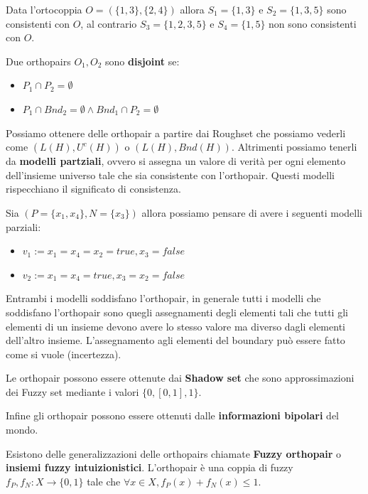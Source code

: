 \begin{esempio}
    Data l'ortocoppia $O=(\{1,3\}, \{2,4\})$ allora $S_1=\{1,3\}$ e $S_2=\{1,3,5\}$ 
    sono consistenti con $O$, al contrario $S_3=\{1,2,3,5\}$ e $S_4=\{1,5\}$ non sono 
    consistenti con $O$.
\end{esempio}

\begin{definizione}
    Due orthopairs $O_1,O_2$ sono \textbf{disjoint} se:
    \begin{itemize}
        \item $P_1\cap P_2=\emptyset$
        \item $P_1\cap Bnd_2=\emptyset\land  Bnd_1\cap P_2=\emptyset$
    \end{itemize}
\end{definizione}

Possiamo ottenere delle orthopair a partire dai Roughset che possiamo vederli come 
$(L(H),U^c(H))$ o $(L(H),Bnd(H))$. Altrimenti possiamo tenerli da \textbf{modelli 
partziali}, ovvero si assegna un valore di verità per ogni elemento dell'insieme 
universo tale che sia consistente con l'orthopair. Questi modelli rispecchiano 
il significato di consistenza.
\begin{esempio}
    Sia $(P = \{x_1,x_4\},N =\{x_3\})$ allora possiamo pensare di avere i seguenti 
    modelli parziali:
    \begin{itemize}
        \item $v_1:= x_1=x_4=x_2 = true, x_3=false$
        \item $v_2:= x_1=x_4= true, x_3=x_2 =false$
    \end{itemize}
    Entrambi i modelli soddisfano l'orthopair, in generale tutti i modelli che 
    soddisfano l'orthopair sono quegli assegnamenti degli elementi tali che tutti 
    gli elementi di un insieme devono avere lo stesso valore ma diverso dagli elementi 
    dell'altro insieme. L'assegnamento agli elementi del boundary può essere fatto 
    come si vuole (incertezza). 
\end{esempio}

Le orthopair possono essere ottenute dai \textbf{Shadow set} che sono approssimazioni 
dei Fuzzy set mediante i valori $\{0, [0,1], 1\}$.

Infine gli orthopair possono essere ottenuti dalle \textbf{informazioni bipolari}
del mondo.

Esistono delle generalizzazioni delle orthopairs chiamate \textbf{Fuzzy orthopair} o \textbf{insiemi
fuzzy intuizionistici}. L'orthopair è una coppia di fuzzy $f_P,f_N:X\to \{0,1\}$
tale che $\forall x\in X, f_P(x)+f_N(x) \le 1$.

